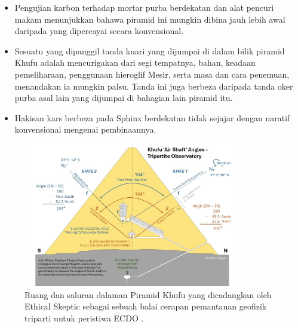 \documentclass[10pt,twocolumn,letterpaper]{article}
\begin{document}
\begin{flushleft}
\begin{itemize}
    \item Pengujian karbon terhadap mortar purba berdekatan dan alat pencuri makam menunjukkan bahawa piramid ini mungkin dibina jauh lebih awal daripada yang dipercayai secara konvensional.
    \item Sesuatu yang dipanggil tanda kuari yang dijumpai di dalam bilik piramid Khufu adalah mencurigakan dari segi tempatnya, bahan, keadaan pemeliharaan, penggunaan hieroglif Mesir, serta masa dan cara penemuan, menandakan ia mungkin palsu. Tanda ini juga berbeza daripada tanda oker purba asal lain yang dijumpai di bahagian lain piramid itu.
    \item Hakisan kars berbeza pada Sphinx berdekatan tidak sejajar dengan naratif konvensional mengenai pembinaannya.
\end{itemize}
\end{flushleft}

\begin{figure}[b]
\begin{center}
\includegraphics[width=0.85\textwidth]{shafts.jpg}
\end{center}
   \caption{Ruang dan saluran dalaman Piramid Khufu yang dicadangkan oleh Ethical Skeptic sebagai sebuah balai cerapan pemantauan geofizik triparti untuk peristiwa ECDO \cite{28}.}
\label{fig:5}
\end{figure}
\end{document}
